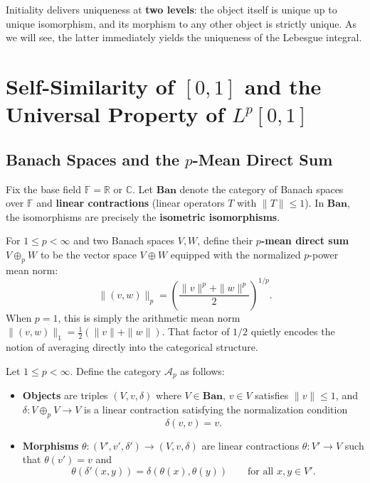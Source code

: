 Initiality delivers uniqueness at \textbf{two levels}: the object itself is unique up to unique isomorphism, and its morphism to any other object is strictly unique. As we will see, the latter immediately yields the uniqueness of the Lebesgue integral.

\section{Self-Similarity of $[0,1]$ and the Universal Property of $L^p[0,1]$}

\subsection{Banach Spaces and the $p$-Mean Direct Sum}

Fix the base field $\mathbb{F} = \mathbb{R}$ or $\mathbb{C}$. Let $\mathbf{Ban}$ denote the category of Banach spaces over $\mathbb{F}$ and \textbf{linear contractions} (linear operators $T$ with $\|T\| \le 1$). In $\mathbf{Ban}$, the isomorphisms are precisely the \textbf{isometric isomorphisms}.

For $1 \le p < \infty$ and two Banach spaces $V, W$, define their \textbf{$p$-mean direct sum} $V \oplus_p W$ to be the vector space $V \oplus W$ equipped with the normalized $p$-power mean norm:
\[
    \|(v, w)\|_p = \left( \frac{\|v\|^p + \|w\|^p}{2} \right)^{1/p}.
\]
When $p = 1$, this is simply the arithmetic mean norm $\|(v, w)\|_1 = \frac{1}{2}(\|v\| + \|w\|)$. That factor of $1/2$ quietly encodes the notion of averaging directly into the categorical structure.

\begin{definition}
Let $1 \le p < \infty$. Define the category $\mathcal{A}_p$ as follows:
\begin{itemize}
    \item \textbf{Objects} are triples $(V, v, \delta)$ where $V \in \mathbf{Ban}$, $v \in V$ satisfies $\|v\| \le 1$, and $\delta : V \oplus_p V \to V$ is a linear contraction satisfying the normalization condition
    \[
        \delta(v, v) = v.
    \]
    \item \textbf{Morphisms} $\theta : (V', v', \delta') \to (V, v, \delta)$ are linear contractions $\theta : V' \to V$ such that $\theta(v') = v$ and
    \[
        \theta(\delta'(x, y)) = \delta(\theta(x), \theta(y)) \qquad \text{for all } x, y \in V'.
    \]
\end{itemize}
\end{definition}


